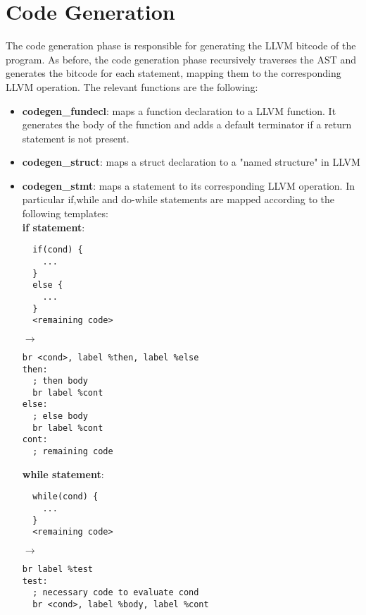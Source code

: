 \documentclass{article}
\begin{document}
\section{Code Generation}
The code generation phase is responsible for generating the LLVM bitcode of the program.
As before, the code generation phase recursively traverses the AST and generates the bitcode for each statement, mapping
them to the corresponding LLVM operation.
The relevant functions are the following:
\begin{itemize}
  \item \textbf{codegen\_fundecl}: maps a function declaration to a LLVM function.
  It generates the body of the function and adds a default terminator if a return statement is not present.
  \item \textbf{codegen\_struct}: maps a struct declaration to a "named structure" in LLVM
  \item \textbf{codegen\_stmt}: maps a statement to its corresponding LLVM operation.
  In particular if,while and do-while statements are mapped according to
  the following templates: \\
  \textbf{if statement}: \\

\begin{minipage}{0.20\textwidth}
\begin{verbatim}
  if(cond) {
    ...
  }
  else {
    ...
  }
  <remaining code>
\end{verbatim}
\end{minipage}
\hspace{1cm} $\rightarrow$ \hspace{0.5cm}
\begin{minipage}{0.45\textwidth}
\begin{verbatim}
br <cond>, label %then, label %else
then:
  ; then body
  br label %cont
else:
  ; else body
  br label %cont
cont:
  ; remaining code
\end{verbatim}
\end{minipage}


\textbf{while statement}: \\

\begin{minipage}{0.20\textwidth}
\begin{verbatim}
  while(cond) {
    ...
  }
  <remaining code>
\end{verbatim}
\end{minipage}
\hspace{1cm} $\rightarrow$ \hspace{0.5cm}
\begin{minipage}{0.45\textwidth}
\begin{verbatim}
br label %test
test:
  ; necessary code to evaluate cond
  br <cond>, label %body, label %cont


\end{verbatim}
\end{minipage}
\end{itemize}
\end{document}
